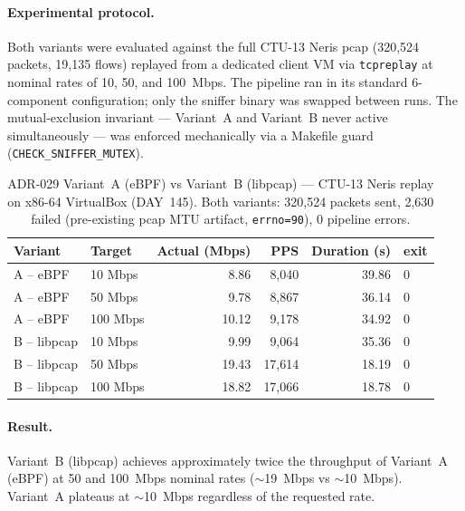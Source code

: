 \documentclass[11pt,a4paper]{article}
\begin{document}
    \paragraph{Experimental protocol.}
    Both variants were evaluated against the full CTU-13 Neris pcap
    (320,524 packets, 19,135 flows) replayed from a dedicated client VM
    via \texttt{tcpreplay} at nominal rates of 10, 50, and 100~Mbps.
    The pipeline ran in its standard 6-component configuration; only the
    sniffer binary was swapped between runs. The mutual-exclusion invariant
    --- Variant~A and Variant~B never active simultaneously --- was enforced
    mechanically via a Makefile guard (\texttt{CHECK\_SNIFFER\_MUTEX}).

    \begin{table}[h]
        \centering
        \caption{ADR-029 Variant~A (eBPF) vs Variant~B (libpcap) --- CTU-13 Neris
        replay on x86-64 VirtualBox (DAY~145). Both variants: 320,524 packets sent,
            2,630 failed (pre-existing pcap MTU artifact, \texttt{errno=90}), 0 pipeline
            errors.}
        \label{tab:adr029}
        \begin{tabular}{llrrrl}
            \toprule
            \textbf{Variant} & \textbf{Target} & \textbf{Actual (Mbps)} & \textbf{PPS} & \textbf{Duration (s)} & \textbf{exit} \\
            \midrule
            A -- eBPF    & 10 Mbps  &  8.86 &  8,040 & 39.86 & 0 \\
            A -- eBPF    & 50 Mbps  &  9.78 &  8,867 & 36.14 & 0 \\
            A -- eBPF    & 100 Mbps & 10.12 &  9,178 & 34.92 & 0 \\
            \midrule
            B -- libpcap & 10 Mbps  &  9.99 &  9,064 & 35.36 & 0 \\
            B -- libpcap & 50 Mbps  & 19.43 & 17,614 & 18.19 & 0 \\
            B -- libpcap & 100 Mbps & 18.82 & 17,066 & 18.78 & 0 \\
            \bottomrule
        \end{tabular}
    \end{table}

    \paragraph{Result.}
    Variant~B (libpcap) achieves approximately twice the throughput of
    Variant~A (eBPF) at 50 and 100~Mbps nominal rates (${\sim}$19~Mbps
    vs ${\sim}$10~Mbps). Variant~A plateaus at ${\sim}$10~Mbps regardless
    of the requested rate.
\end{document}
